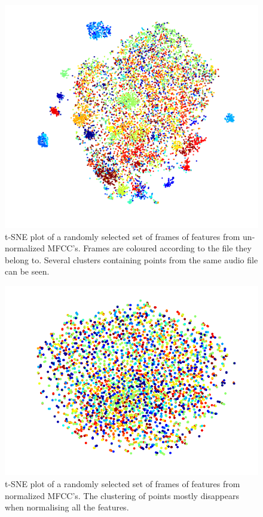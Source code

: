 \documentclass[a4paper,11pt,notitlepage]{article}
\begin{document}
\begin{figure}[H]
	\centering
	\vspace{0.5cm}
	\includegraphics[scale = 0.65]{figs/tsne2.png}
	\caption{t-SNE plot of a randomly selected set of frames of features from un-normalized MFCC's. Frames are coloured according to the file they belong to. Several clusters containing points from the same audio file can be seen.}
	\label{tsne_unnorm}
\end{figure}

\begin{figure}[H]
	\centering
	\vspace{0.5cm}
	\includegraphics[scale = 0.75]{figs/tsne_normalised.png}
	\caption{t-SNE plot of a randomly selected set of frames of features from normalized MFCC's. The clustering of points mostly disappears when normalising all the features.}
	\label{tsne_norm}
\end{figure}
\end{document}

